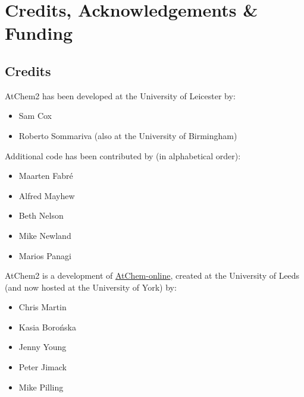%
%
%
%

\chapter{Credits, Acknowledgements \& Funding} \label{ch:credits}

\setlength{\parindent}{0pt}

\section{Credits} \label{sec:credits}

AtChem2 has been developed at the University of Leicester by:

\begin{itemize}
\item Sam Cox
\item Roberto Sommariva (also at the University of Birmingham)
\end{itemize}

Additional code has been contributed by (in alphabetical order):

\begin{itemize}
\item Maarten Fabr{\'e}
\item Alfred Mayhew
\item Beth Nelson
\item Mike Newland
\item Marios Panagi
\end{itemize}

AtChem2 is a development of \href{https://atchem.york.ac.uk/}{AtChem-online},
created at the University of Leeds (and now hosted at the University of York) by:

\begin{itemize}
\item Chris Martin
\item Kasia Boro{\'n}ska
\item Jenny Young
\item Peter Jimack
\item Mike Pilling
\end{itemize}

